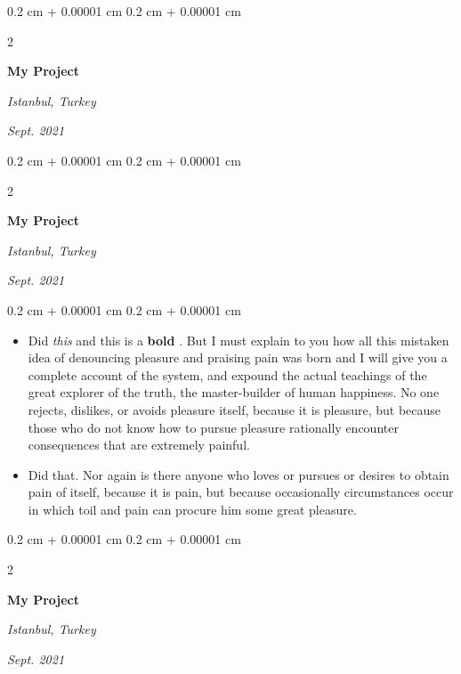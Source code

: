 \documentclass[10pt, letterpaper]{article}
\newenvironment{highlights}{
    \begin{itemize}[
        topsep=0.10 cm,
        parsep=0.10 cm,
        partopsep=0pt,
        itemsep=0pt,
        leftmargin=0.4 cm + 10pt
    ]
}{
    \end{itemize}
} %
\newenvironment{onecolentry}{
    \begin{adjustwidth}{
        0.2 cm + 0.00001 cm
    }{
        0.2 cm + 0.00001 cm
    }
}{
    \end{adjustwidth}
} %
\newenvironment{twocolentry}[2][]{
    \onecolentry
    \def\secondColumn{#2}
    \setcolumnwidth{\fill, 4.5 cm}
    \begin{paracol}{2}
}{
    \switchcolumn \raggedleft \secondColumn
    \end{paracol}
    \endonecolentry
} %
\let\hrefWithoutArrow\href
\renewcommand{\href}[2]{\hrefWithoutArrow{#1}{\mbox{\ifthenelse{\equal{#2}{}}{ }{#2 }\raisebox{.15ex}{\footnotesize \faExternalLink*}}}}
\begin{document}
        \vspace{0.2 cm-3px}

        \begin{twocolentry}{
        \textit{Istanbul, Turkey}    
            
        \textit{Sept. 2021}}
            \textbf{My Project}
        \end{twocolentry}



        \vspace{0.2 cm-3px}

        \begin{twocolentry}{
        \textit{Istanbul, Turkey}    
            
        \textit{Sept. 2021}}
            \textbf{My Project}
        \end{twocolentry}

        \vspace{0.10 cm-3px}
        \begin{onecolentry}
            \begin{highlights}
                \item Did \textit{this} and this is a \textbf{bold} \href{https://example.com}{link}. But I must explain to you how all this mistaken idea of denouncing pleasure and praising pain was born and I will give you a complete account of the system, and expound the actual teachings of the great explorer of the truth, the master-builder of human happiness. No one rejects, dislikes, or avoids pleasure itself, because it is pleasure, but because those who do not know how to pursue pleasure rationally encounter consequences that are extremely painful.
                \item Did that. Nor again is there anyone who loves or pursues or desires to obtain pain of itself, because it is pain, but because occasionally circumstances occur in which toil and pain can procure him some great pleasure.
            \end{highlights}
        \end{onecolentry}


        \vspace{0.2 cm-3px}

        \begin{twocolentry}{
        \textit{Istanbul, Turkey}    
            
        \textit{Sept. 2021}}
            \textbf{My Project}
        \end{twocolentry}
\end{document}
